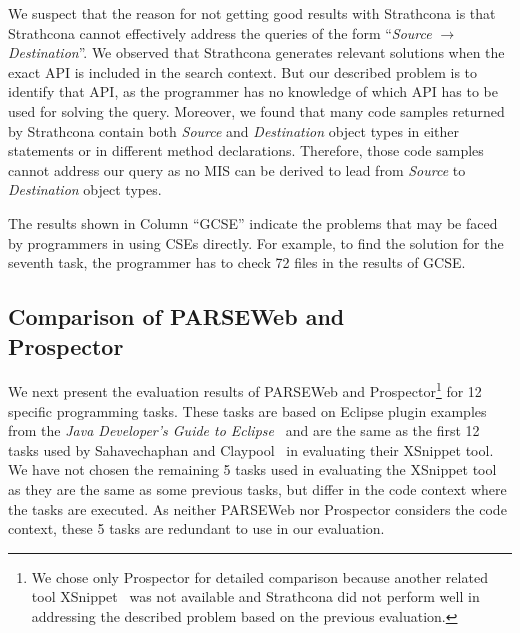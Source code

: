 \documentclass{fp035-thummalapenta}
\begin{document}
We suspect that the reason for not getting good results with
Strathcona is that Strathcona cannot effectively address the queries
of the form ``\emph{Source} $\rightarrow$ \emph{Destination}''. We
observed that Strathcona generates relevant solutions when the exact
API is included in the search context.
But our described problem is to identify that API, as
the programmer has no knowledge of which API has to be used for
solving the query. Moreover, we found that many code samples
returned by Strathcona contain both \emph{Source} and
\emph{Destination} object types in either  statements
or in different method declarations. Therefore, those code samples
cannot address our query as no MIS can be derived to lead from
\emph{Source} to \emph{Destination} object types.

The results shown in Column ``GCSE'' indicate the problems that may
be faced by programmers in using CSEs directly. For
example, to find the solution for the seventh task, the programmer
has to check 72 files in the results of GCSE.
\subsection{Comparison of PARSEWeb and \\Prospector}
\label{sec:parseweb_pros}

We next present the evaluation results of PARSEWeb and
Prospector\footnote{We chose only Prospector for detailed comparison
because another related tool XSnippet~\cite{xsnippet:saha} was not
available and Strathcona did not perform well in addressing the
described problem based on the previous evaluation.} for 12 specific
programming tasks. These tasks are based on Eclipse plugin examples
from the \emph{Java Developer's Guide to Eclipse}~\cite{java:eclipse} and are the same as the first 12 tasks
used by Sahavechaphan and Claypool~\cite{xsnippet:saha} in
evaluating their XSnippet tool. We have not chosen the remaining 5
tasks used in evaluating the XSnippet tool as they are the same as
some previous tasks, but differ in the code context where the tasks
are executed. As neither PARSEWeb nor Prospector considers the code
context, these 5 tasks are redundant to use in our evaluation.
\end{document}
